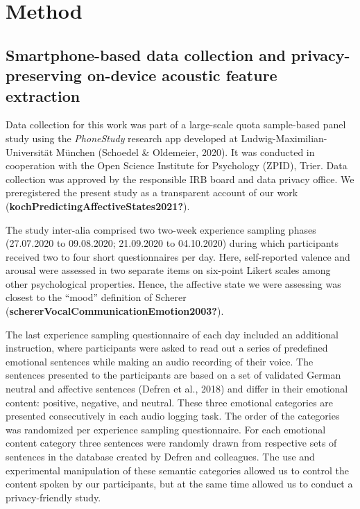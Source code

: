 \documentclass[
  english,
  man,floatsintext]{apa6}
\begin{document}
\hypertarget{method}{%
\section{Method}\label{method}}

\hypertarget{smartphone-based-data-collection-and-privacy-preserving-on-device-acoustic-feature-extraction}{%
\subsection{Smartphone-based data collection and privacy-preserving on-device acoustic feature extraction}\label{smartphone-based-data-collection-and-privacy-preserving-on-device-acoustic-feature-extraction}}

Data collection for this work was part of a large-scale quota sample-based panel study using the \emph{PhoneStudy} research app developed at Ludwig-Maximilian-Universität München (Schoedel \& Oldemeier, 2020). It was conducted in cooperation with the Open Science Institute for Psychology (ZPID), Trier. Data collection was approved by the responsible IRB board and data privacy office. We preregistered the present study as a transparent account of our work (\textbf{kochPredictingAffectiveStates2021?}).

The study inter-alia comprised two two-week experience sampling phases (27.07.2020 to 09.08.2020; 21.09.2020 to 04.10.2020) during which participants received two to four short questionnaires per day. Here, self-reported valence and arousal were assessed in two separate items on six-point Likert scales among other psychological properties. Hence, the affective state we were assessing was closest to the ``mood'' definition of Scherer (\textbf{schererVocalCommunicationEmotion2003?}).

The last experience sampling questionnaire of each day included an additional instruction, where participants were asked to read out a series of predefined emotional sentences while making an audio recording of their voice. The sentences presented to the participants are based on a set of validated German neutral and affective sentences (Defren et al., 2018) and differ in their emotional content: positive, negative, and neutral. These three emotional categories are presented consecutively in each audio logging task. The order of the categories was randomized per experience sampling questionnaire. For each emotional content category three sentences were randomly drawn from respective sets of sentences in the database created by Defren and colleagues. The use and experimental manipulation of these semantic categories allowed us to control the content spoken by our participants, but at the same time allowed us to conduct a privacy-friendly study.
\end{document}
